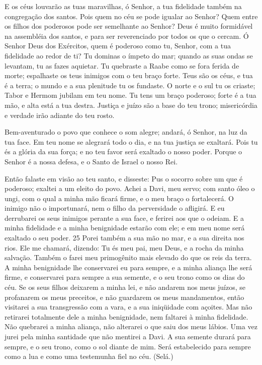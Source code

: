E os céus louvarão as tuas maravilhas, ó Senhor, a tua fidelidade
também na congregação dos santos. Pois quem no céu se pode
igualar ao Senhor? Quem entre os filhos dos poderosos pode ser
semelhante ao Senhor? Deus é muito formidável na assembléia dos
santos, e para ser reverenciado por todos os que o cercam. Ó
Senhor Deus dos Exércitos, quem é poderoso como tu, Senhor, com a
tua fidelidade ao redor de ti? Tu dominas o ímpeto do mar;
quando as suas ondas se levantam, tu as fazes aquietar. Tu
quebraste a Raabe como se fora ferida de morte; espalhaste os teus
inimigos com o teu braço forte. Teus são os céus, e tua é a
terra; o mundo e a sua plenitude tu os fundaste. O norte e o
sul tu os criaste; Tabor e Hermom jubilam em teu nome. Tu
tens um braço poderoso; forte é a tua mão, e alta está a tua destra.
Justiça e juízo são a base do teu trono; misericórdia e
verdade irão adiante do teu rosto.

Bem-aventurado o povo que conhece o som alegre; andará, ó Senhor,
na luz da tua face. Em teu nome se alegrará todo o dia, e na
tua justiça se exaltará. Pois tu és a glória da sua força; e
no teu favor será exaltado o nosso poder. Porque o Senhor é a
nossa defesa, e o Santo de Israel o nosso Rei.

Então falaste em visão ao teu santo, e disseste: Pus o socorro
sobre um que é poderoso; exaltei a um eleito do povo. Achei a
Davi, meu servo; com santo óleo o ungi, com o qual a minha
mão ficará firme, e o meu braço o fortalecerá. O inimigo não
o importunará, nem o filho da perversidade o afligirá. E eu
derrubarei os seus inimigos perante a sua face, e ferirei aos que o
odeiam. E a minha fidelidade e a minha benignidade estarão
com ele; e em meu nome será exaltado o seu poder. 25 Porei também a
sua mão no mar, e a sua direita nos rios. Ele me chamará,
dizendo: Tu és meu pai, meu Deus, e a rocha da minha salvação.
Também o farei meu primogênito mais elevado do que os reis da
terra. A minha benignidade lhe conservarei eu para sempre, e
a minha aliança lhe será firme, e conservarei para sempre a
sua semente, e o seu trono como os dias do céu. Se os seus
filhos deixarem a minha lei, e não andarem nos meus juízos,
se profanarem os meus preceitos, e não guardarem os meus
mandamentos, então visitarei a sua transgressão com a vara, e
a sua iniqüidade com açoites. Mas não retirarei totalmente
dele a minha benignidade, nem faltarei à minha fidelidade.
Não quebrarei a minha aliança, não alterarei o que saiu dos
meus lábios. Uma vez jurei pela minha santidade que não
mentirei a Davi. A sua semente durará para sempre, e o seu
trono, como o sol diante de mim. Será estabelecido para
sempre como a lua e como uma testemunha fiel no céu. (Selá.)

